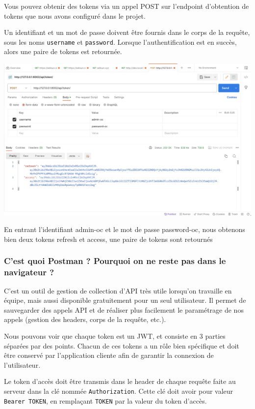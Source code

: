 Vous pouvez obtenir des tokens via un appel POST sur l'endpoint d’obtention de tokens que nous avons configuré dans le projet.

Un identifiant et un mot de passe doivent être fournis dans le corps de la requête, sous les noms {\tt username}  et {\tt password}. Lorsque l’authentification est en succès, alors une paire de tokens est retournée.
\begin{center}
\includegraphics[width=15cm]{images/image24.png}
\end{center}
En entrant l’identifiant admin-oc et le mot de passe password-oc, nous obtenons bien deux tokens refresh et access, une paire de tokens sont retournés

\subsubsection*{C’est quoi Postman ? Pourquoi on ne reste pas dans le navigateur ?}
C’est un outil de gestion de collection d’API très utile lorsqu’on travaille en équipe, mais aussi disponible gratuitement pour un seul utilisateur. Il permet de {\color{monOrange}sauvegarder des appels API} et de réaliser plus facilement le {\color{monOrange}paramétrage de nos appels} (gestion des headers, corps de la requête, etc.).

Nous pouvons voir que chaque token est un JWT, et consiste en 3 parties séparées par des points. Chacun de ces tokens a un {\color{monOrange}rôle bien spécifique} et doit être {\color{monOrange}conservé} par l’application cliente afin de garantir la connexion de l’utilisateur.

Le token d’accès doit être transmis dans le header de chaque requête faite au serveur dans la clé nommée {\tt Authorization}. Cette clé doit avoir pour valeur  {\tt Bearer TOKEN}, en remplaçant  {\tt TOKEN}   par la valeur du token d’accès.



